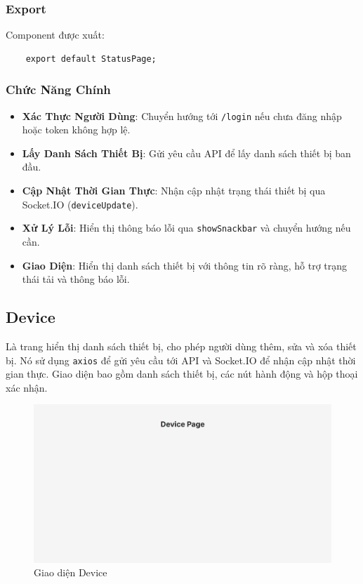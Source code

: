             \subsubsection{Export}
                \hspace*{0.6cm}Component được xuất:
                \begin{lstlisting}
    export default StatusPage;
                \end{lstlisting}

            \subsubsection{Chức Năng Chính}
                \begin{itemize}
                    \item \textbf{Xác Thực Người Dùng}: Chuyển hướng tới \texttt{/login} nếu chưa đăng nhập hoặc token không hợp lệ.
                    \item \textbf{Lấy Danh Sách Thiết Bị}: Gửi yêu cầu API để lấy danh sách thiết bị ban đầu.
                    \item \textbf{Cập Nhật Thời Gian Thực}: Nhận cập nhật trạng thái thiết bị qua Socket.IO (\texttt{deviceUpdate}).
                    \item \textbf{Xử Lý Lỗi}: Hiển thị thông báo lỗi qua \texttt{showSnackbar} và chuyển hướng nếu cần.
                    \item \textbf{Giao Diện}: Hiển thị danh sách thiết bị với thông tin rõ ràng, hỗ trợ trạng thái tải và thông báo lỗi.
                \end{itemize}
        \subsection{Device}
            \hspace*{0.6cm}Là trang hiển thị danh sách thiết bị, cho phép người dùng thêm, sửa và xóa thiết bị. Nó sử dụng \texttt{axios} để gửi yêu cầu tới API và Socket.IO để nhận cập nhật thời gian thực. Giao diện bao gồm danh sách thiết bị, các nút hành động và hộp thoại xác nhận.
            \begin{figure}[H]
                \centering
                \includegraphics[width=1\textwidth]{pictures/Device.png}
                \caption{Giao diện Device}
                \label{fig:device}
            \end{figure}

